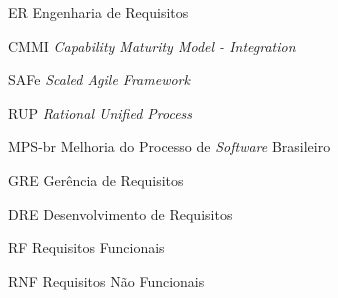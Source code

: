 \begin{siglas}
	\item[ER] Engenharia de Requisitos
  \item[CMMI] \textit{Capability Maturity Model - Integration}
  \item[SAFe] \textit{Scaled Agile Framework}
  \item[RUP] \textit{Rational Unified Process}
	\item[MPS-br] Melhoria do Processo de \textit{Software} Brasileiro
	\item[GRE] Gerência de Requisitos
	\item[DRE] Desenvolvimento de Requisitos
	\item[RF] Requisitos Funcionais
	\item[RNF] Requisitos Não Funcionais
\end{siglas}
